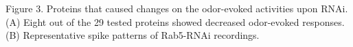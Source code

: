 Figure 3. Proteins that caused changes on the odor-evoked activities upon RNAi. (A) Eight out of the 29 tested proteins showed decreased odor-evoked responses. (B) Representative spike patterns of Rab5-RNAi recordings.